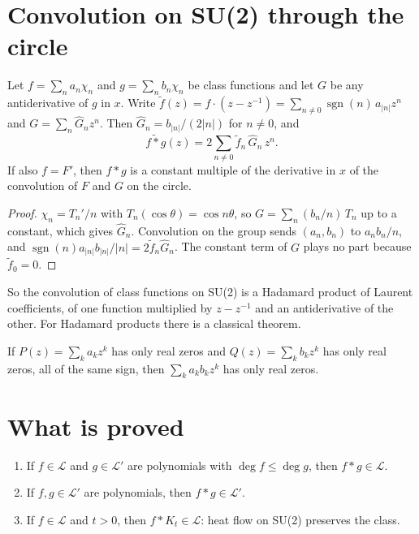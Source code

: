 \section{Convolution on SU(2) through the circle}\label{sec:circlecv}

\begin{lemma}\label{lem:circle}
Let $f=\sum_na_n\chi_n$ and $g=\sum_nb_n\chi_n$ be class functions and let $G$ be any antiderivative of $g$ in $x$. Write $\tilde f(z)=f\cdot(z-z^{-1})=\sum_{n\ne0}\operatorname{sgn}(n)\,a_{|n|}z^n$ and $G=\sum_n\hat G_nz^n$. Then $\hat G_n=b_{|n|}/(2|n|)$ for $n\ne0$, and
\[
\widetilde{f*g}(z)=2\sum_{n\ne0}\tilde f_n\,\hat G_n\,z^n .
\]
If also $f=F'$, then $f*g$ is a constant multiple of the derivative in $x$ of the convolution of $F$ and $G$ on the circle.
\end{lemma}

\begin{proof}
$\chi_n=T_n'/n$ with $T_n(\cos\theta)=\cos n\theta$, so $G=\sum_n(b_n/n)\,T_n$ up to a constant, which gives $\hat G_n$. Convolution on the group sends $(a_n,b_n)$ to $a_nb_n/n$, and $\operatorname{sgn}(n)a_{|n|}b_{|n|}/|n|=2\tilde f_n\hat G_n$. The constant term of $G$ plays no part because $\tilde f_0=0$.
\end{proof}

So the convolution of class functions on SU(2) is a Hadamard product of Laurent coefficients, of one function multiplied by $z-z^{-1}$ and an antiderivative of the other. For Hadamard products there is a classical theorem.

\begin{theorem}\label{thm:malo}
If $P(z)=\sum_ka_kz^k$ has only real zeros and $Q(z)=\sum_kb_kz^k$ has only real zeros, all of the same sign, then $\sum_ka_kb_kz^k$ has only real zeros.
\end{theorem}

\section{What is proved}

\begin{theorem}\label{thm:zeros}
\begin{enumerate}
\item[(i)] If $f\in\mathcal L$ and $g\in\mathcal L'$ are polynomials with $\deg f\le\deg g$, then $f*g\in\mathcal L$.
\item[(ii)] If $f,g\in\mathcal L'$ are polynomials, then $f*g\in\mathcal L'$.
\item[(iii)] If $f\in\mathcal L$ and $t>0$, then $f*K_t\in\mathcal L$: heat flow on SU(2) preserves the class.
\end{enumerate}
\end{theorem}

